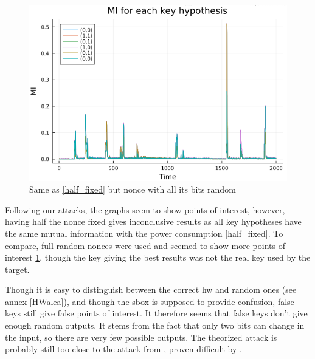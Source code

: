 \documentclass[11pt,technote]{IEEEtran}
\begin{document}
		\begin{figure}[h]
			\centering
			\includegraphics[scale=0.4]{img_files/nonces_alea}
			\caption{Same as \ref{half_fixed} but nonce with all its bits random}
			\label{all_alea}
		\end{figure}
		
		Following our attacks, the graphs seem to show points of interest, however, having half the nonce fixed gives inconclusive results as all key hypotheses have the same mutual information with the power consumption \ref{half_fixed}. To compare, full random nonces were used and seemed to show more points of interest \ref{all_alea}, though the key giving the best results was not the real key used by the target.
		
		Though it is easy to distinguish between the correct \ac{hw} and random ones (see annex \ref{HWalea}), and though the \ac{sbox} is supposed to provide confusion, false keys still give false points of interest. It therefore seems that false keys don't give enough random outputs. It stems from the fact that only two bits can change in the input, so there are very few possible outputs. The theorized attack is probably still too close to the attack from \cite{dl_cpa}, proven difficult by \cite{cpa_analysis}.
		
\end{document}
